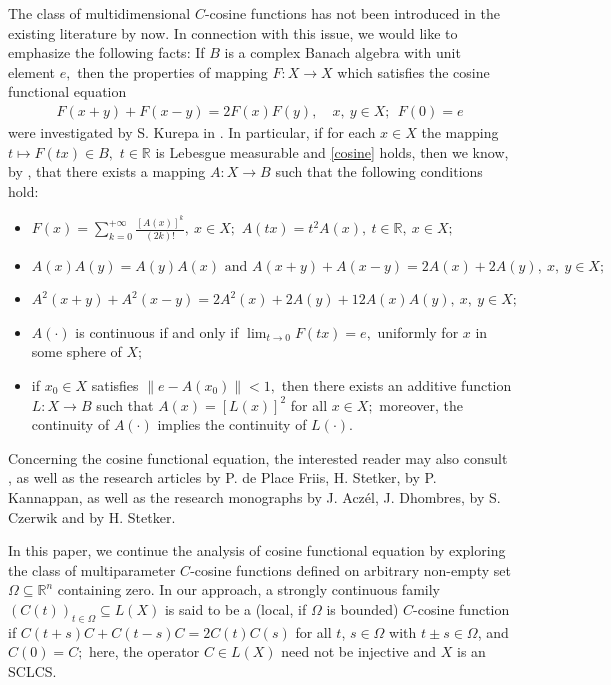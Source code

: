 \documentclass{amsart}
\theoremstyle{definition}
\theoremstyle{remark}
\numberwithin{equation}{section}
\begin{document}
The class of multidimensional $C$-cosine functions has not been introduced in the existing literature by now. In connection with this issue, we would like to emphasize the following facts: 
If $B$ is a complex Banach algebra with unit element $e,$ then the properties of mapping $F: X\rightarrow X$ which satisfies the cosine functional equation
\begin{align}\label{cosine}
F(x+y)+F(x-y)=2F(x)F(y),\quad x,\ y\in X;\ \ F(0)=e
\end{align}
were investigated by S. Kurepa in \cite[Section 3]{skurepa}. In particular, if for each $x\in X$ the mapping $t\mapsto F(tx)\in B,$ $t\in {\mathbb R}$ is Lebesgue measurable and \eqref{cosine} holds, then we know, by \cite[Theorem 3]{skurepa}, that there exists a mapping $A: X \rightarrow B$ such that the following conditions hold:
\begin{itemize}
\item[(i)] $F(x)=\sum_{k=0}^{+\infty}\frac{[A(x)]^{k}}{(2k)!},\ x\in  X;$ $A(tx)=t^{2}A(x),\ t\in {\mathbb R},\ x\in X;$
\item[(ii)] $A(x)A(y)=A(y)A(x)\mbox{ and }A(x+y)+A(x-y)=2A(x)+2A(y),\ x,\ y\in X;$
\item[(iii)] $A^{2}(x+y)+A^{2}(x-y)=2A^{2}(x)+2A(y)+12A(x)A(y),\ x,\ y\in X;$
\item[(iv)] $A(\cdot)$ is continuous if and only if $\lim_{t\rightarrow 0}F(tx)=e,$ uniformly for $x$ in some sphere of $X;$
\item[(v)] if $x_{0}\in X$ satisfies $\|e-A(x_{0}) \|<1,$ then there exists an additive function $L: X \rightarrow B$ such that $A(x)=[L(x)]^{2}$ for all $x\in X;$ moreover, the continuity of $A(\cdot)$ implies the continuity of $L(\cdot).$
\end{itemize}
Concerning the cosine functional equation, the interested reader may also consult \cite[Theorem 3, Theorem 5]{kurepa}, as well as the research articles \cite{fris} by  
P. de Place Friis, H. Stetker, \cite{kana} by P. Kannappan, as well as the research monographs \cite{ace} by 
J. Acz\'el, J. Dhombres, \cite{cer} by S. Czerwik and \cite{stet} by H. Stetker.

In this paper, we continue the analysis of cosine functional equation by exploring the class of multiparameter $C$-cosine functions defined on arbitrary non-empty set $\Omega \subseteq {\mathbb R}^{n}$ containing zero. In our approach, a strongly continuous family $(C(t))_{t\in \Omega}\subseteq L(X)$ 
is said to be a (local, if $\Omega$ is bounded) $C$-cosine function if $C(t+s)C+C(t-s)C=2C(t)C(s)$ for all $t$, $s\in \Omega$ with $t\pm s \in \Omega$,
and $C(0)=C;$ here, the operator $C \in L(X)$ need not be injective and $X$ is an SCLCS. 
\end{document}
